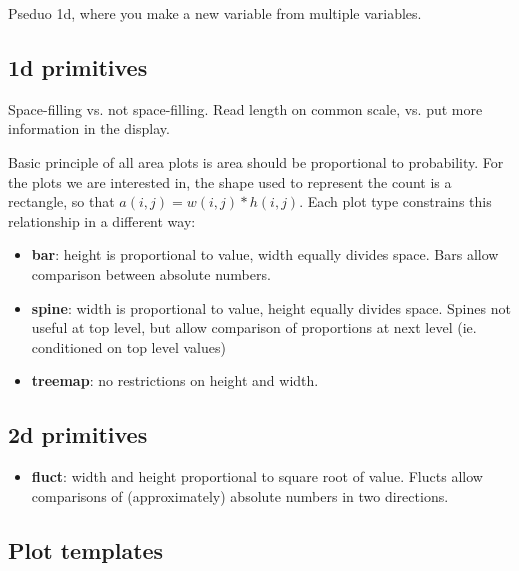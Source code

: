 \documentclass[letterpaper,oneside]{scrartcl}
\begin{document}
Pseduo 1d, where you make a new variable from multiple variables.

\subsection{1d primitives}

Space-filling vs. not space-filling.  Read length on common scale, vs. put more information in the display.

Basic principle of all area plots is area should be proportional to probability. For the plots we are interested in, the shape used to represent the count is a rectangle, so that $a(i, j) = w(i, j) * h(i, j)$. Each plot type constrains this relationship in a different way:

\begin{itemize}
  \item {\bf bar}: height is proportional to value, width equally divides space. Bars allow comparison between absolute numbers.

  \item {\bf spine}: width is proportional to value, height equally divides space. Spines not useful at top level, but allow comparison of proportions at next level (ie. conditioned on top level values)

  \item {\bf treemap}: no restrictions on height and width.

\end{itemize}

\subsection{2d primitives}

\begin{itemize}
  \item {\bf fluct}: width and height proportional to square root of value. Flucts allow comparisons of (approximately) absolute numbers in two directions. 
  
\end{itemize}

\subsection{Plot templates}
\end{document}
